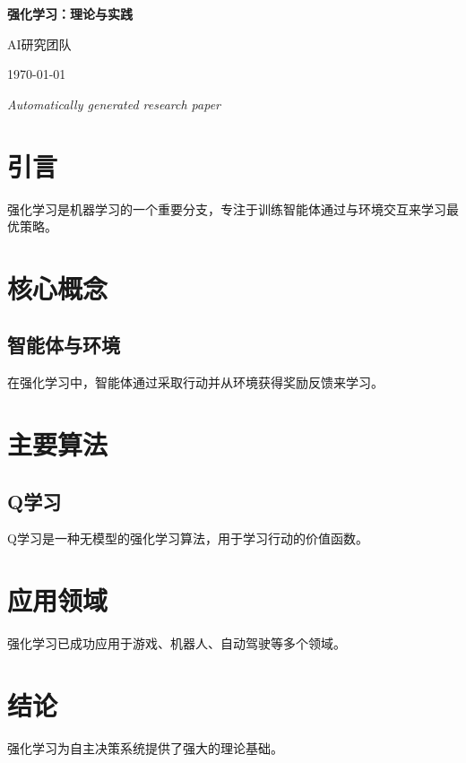 \documentclass[12pt]{article}
\begin{document}
\begin{titlepage}
    \centering
    \vspace*{2cm}
    {\Huge\bfseries 强化学习：理论与实践\par}
    \vspace{1.5cm}
    {\large AI研究团队\par}
    \vspace{0.5cm}
    {\large \today\par}
    \vfill
    {\large \textit{Automatically generated research paper}\par}
\end{titlepage}

\begin{abstract}
This paper presents research findings and analysis in the field of 强化学习：理论与实践. 
The content has been automatically generated and compiled into a professional academic format.
\end{abstract}

\tableofcontents
\newpage

\section{引言}
强化学习是机器学习的一个重要分支，专注于训练智能体通过与环境交互来学习最优策略。

\section{核心概念}
\subsection{智能体与环境}
在强化学习中，智能体通过采取行动并从环境获得奖励反馈来学习。

\section{主要算法}
\subsection{Q学习}
Q学习是一种无模型的强化学习算法，用于学习行动的价值函数。

\section{应用领域}
强化学习已成功应用于游戏、机器人、自动驾驶等多个领域。

\section{结论}
强化学习为自主决策系统提供了强大的理论基础。




\end{document}
